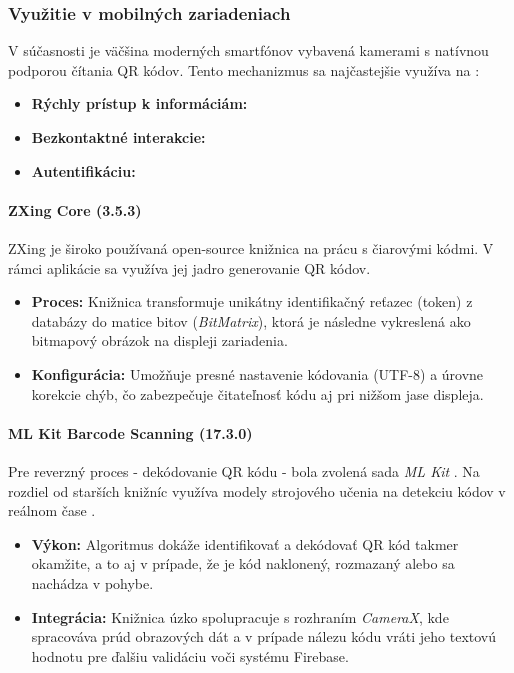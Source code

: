 \subsubsection{Využitie v mobilných zariadeniach}
V súčasnosti je väčšina moderných smartfónov vybavená kamerami s natívnou podporou čítania QR kódov. Tento mechanizmus sa najčastejšie využíva na \cite{iso18004_2024}:
\begin{itemize}[noitemsep, topsep=0pt]
    \item \textbf{Rýchly prístup k informáciám:} 
    \item \textbf{Bezkontaktné interakcie:} 
    \item \textbf{Autentifikáciu:} 
\end{itemize}

\paragraph{ZXing Core (3.5.3)}
ZXing je široko používaná open-source knižnica na prácu s čiarovými kódmi.
 V rámci aplikácie sa využíva jej jadro generovanie QR kódov\cite{zxing_repo, zxing_github}. 
\begin{itemize}[noitemsep, topsep=0pt]
    \item \textbf{Proces:} Knižnica transformuje unikátny identifikačný reťazec (token) z databázy do matice bitov (\textit{BitMatrix}), ktorá je následne vykreslená ako bitmapový obrázok na displeji zariadenia.
    \item \textbf{Konfigurácia:} Umožňuje presné nastavenie kódovania (UTF-8) a úrovne korekcie chýb, čo zabezpečuje čitateľnosť kódu aj pri nižšom jase displeja.
\end{itemize}


\paragraph{ML Kit Barcode Scanning (17.3.0)}
Pre reverzný proces - dekódovanie QR kódu - bola zvolená sada \textit{ML Kit} . Na rozdiel od 
starších knižníc využíva modely strojového učenia na detekciu kódov v reálnom čase \cite{mlkit_barcode}.
\begin{itemize}[noitemsep, topsep=0pt]
    \item \textbf{Výkon:} Algoritmus dokáže identifikovať a dekódovať QR kód takmer okamžite, 
    a to aj v prípade, že je kód naklonený, rozmazaný alebo sa nachádza v pohybe.
    \item \textbf{Integrácia:} Knižnica úzko spolupracuje s rozhraním \textit{CameraX}, 
    kde spracováva prúd obrazových dát  a v prípade nálezu kódu vráti jeho textovú hodnotu pre ďalšiu validáciu voči systému Firebase.
\end{itemize}


